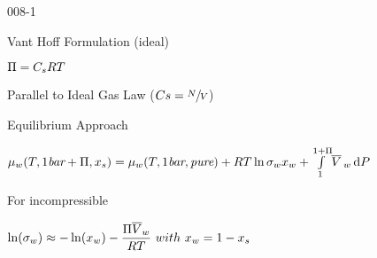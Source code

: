 \begin{mitframe}{008-1} %


\begin{listone}

	\item Vant Hoff Formulation (ideal)
	
    \begin{listtwo} 
		
        \item $\osmpress = \conc_{s}\gasconst\Temp $
	    	\item Parallel to Ideal Gas Law ($\conc s  = \sfrac{\nummoles}{\vol}$)
            
        
	
    \end{listtwo}
	
    \item Equilibrium Approach
	
    \begin{listtwo}
    
		\item $\chempot_{w}(\Temp,1\textit{bar}+\osmpress,\specfrac{s}) = \chempot_{w}(\Temp,1\textit{bar},\textit{pure})+\gasconst\Temp\ln\surftens_{w}\specfrac{w}+\int\limits_{1}^{1+\osmpress}\!\overline{\vol}\,_{w}\, \mathrm{d}\p$
        
        
		
        \begin{listthree}
        
			\item For incompressible
            
			\begin{listfour}
					\item $\ln(\surftens_{w}) \approx -\ln(\specfrac{w})-\dfrac{\osmpress\overline{\vol}_{w}}{\gasconst\Temp}~with~\specfrac{w} = 1 - \specfrac{s}$


\end{listfour}
\end{listthree}
\end{listtwo}
\end{listone}
\end{mitframe}

